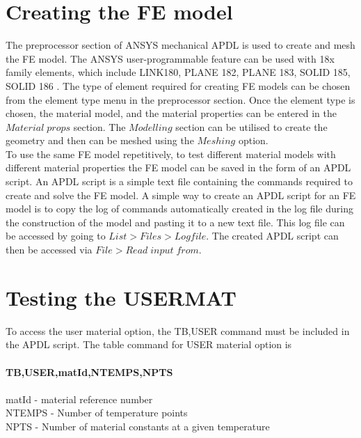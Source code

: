 \documentclass[12pt,a4paper,twoside,openright]{report}
\begin{document}
\section{Creating the FE model}
\indent\indent\indent  The preprocessor section of ANSYS mechanical APDL is used to create and mesh the FE model. The ANSYS user-programmable feature can be used with 18x family elements, which include LINK180, PLANE 182, PLANE 183, SOLID 185, SOLID 186 \citep{lin1999ansys}. The type of element required for creating FE models can be chosen from the element type menu in the preprocessor section. Once the element type is chosen, the material model, and the material properties can be entered in the $Material\; props$ section.  The $Modelling$ section can be utilised to create the geometry and then can be meshed using the $Meshing$ option.\\ \indent\indent\indent To use the same FE model repetitively, to test different material models with different material properties the FE model can be saved in the form of an APDL script.  An APDL script is a simple text file containing the commands required to create and solve the FE model. A simple way to create an APDL script for an FE model is to copy the log of commands automatically created in the log file during the construction of the model and pasting it to a new text file. This log file can be accessed by going to $List>Files>Logfile$. The created APDL script can then be accessed via $File>Read \;input\; from$.

\section{Testing the USERMAT}
\indent\indent\indent  To access the user material option, the TB,USER command must be included in the APDL script. The table command for USER material option is\\
\\
\textbf{TB,USER,matId,NTEMPS,NPTS \citep{lin1999ansys}}
\\
\\
\indent matId - material reference number
\\
\indent NTEMPS - Number of temperature points 
\\
\indent NPTS  -  Number of material constants at a given temperature
\\
\end{document}
